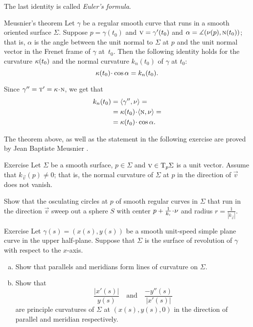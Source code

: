 The last identity is called \emph{Euler's formula}.


\begin{thm}{Meusnier's theorem}\label{thm:meusnier}
Let $\gamma$ be a regular smooth curve that runs in a smooth oriented surface $\Sigma$.
Suppose $p=\gamma(t_0)$ and ${\vec v}\z=\gamma'(t_0)$ and $\alpha=\measuredangle(\nu(p),\textsc{n}(t_0))$;
that is, $\alpha$ is the angle between the unit normal to $\Sigma$ at $p$ and the unit normal vector in the Frenet frame of $\gamma$ at~$t_0$.
Then the following identity holds for the curvature $\kappa(t_0)$ and the normal curvature $k_n(t_0)$ of $\gamma$ at $t_0$:  
\[\kur(t_0)\cdot\cos\alpha=k_{n}(t_0).\]

\end{thm}


 Since $\gamma''=\tan'=\kur\cdot \norm$, we get that
\begin{align*}
k_{n}(t_0)&=\langle\gamma'',\Norm\rangle=
\\
&=\kur(t_0)\cdot\langle\norm,\Norm\rangle=
\\
&=\kur(t_0)\cdot\cos\alpha.
\end{align*}
\qedsf

The theorem above, as well as the statement in the following exercise are proved by Jean Baptiste Meusnier \cite{meusnier}.

\begin{thm}{Exercise}\label{ex:meusnier}
Let $\Sigma$ be a smooth surface, $p\in\Sigma$ and ${\textsc v}\in \mathrm{T}_p\Sigma$ is a unit vector.
Assume that $k_{\vec v}(p)\ne 0$; that is, the normal curvature of $\Sigma$ at $p$ in the direction of ${\vec v}$ does not vanish.

Show that the osculating circles at $p$ of smooth regular curves in $\Sigma$ that run in the direction ${\vec v}$ sweep out a sphere $S$ with center $p+\tfrac1{k_{\vec v}}\cdot\Norm$ and radius $r=\tfrac1{|k_{\vec v}|}$.
\end{thm}

\begin{thm}{Exercise}\label{ex:principle-revolution}
Let $\gamma(s)=(x(s),y(s))$ be a smooth unit-speed simple plane curve in the upper half-plane.
Suppose that $\Sigma$ is the surface of revolution of $\gamma$ with respect to the $x$-axis.

\begin{enumerate}[(a)]
\item Show that parallels and meridians form lines of curvature on $\Sigma$.
\item Show that 
\[\frac{|x'(s)|}{y(s)}
\quad
\text{and}
\quad
\frac{-y''(s)}{|x'(s)|}
\]
are principle curvatures of $\Sigma$ at $(x(s),y(s),0)$ in the direction of parallel and meridian respectively.
\end{enumerate}

\end{thm}


